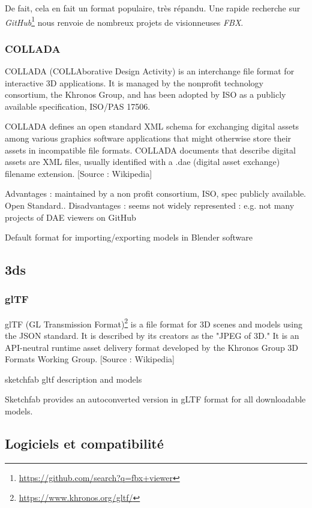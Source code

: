 De fait, cela en fait un format populaire, très répandu.
Une rapide recherche sur \textit{GitHub}\footnote{\url{https://github.com/search?q=fbx+viewer}} nous renvoie de nombreux projets de visionneuses \textit{FBX}.

\subsubsection{COLLADA}
COLLADA (COLLAborative Design Activity) is an interchange file format for interactive 3D applications. It is managed by the nonprofit technology consortium, the Khronos Group, and has been adopted by ISO as a publicly available specification, ISO/PAS 17506.

COLLADA defines an open standard XML schema for exchanging digital assets among various graphics software applications that might otherwise store their assets in incompatible file formats. COLLADA documents that describe digital assets are XML files, usually identified with a .dae (digital asset exchange) filename extension. [Source : Wikipedia]

Advantages : maintained by a non profit consortium, ISO, spec publicly available. Open Standard..
Disadvantages : seems not widely represented : e.g. not many projects of DAE viewers on GitHub

Default format for importing/exporting models in Blender software

\subsection{3ds}


\subsubsection{glTF}
\label{sec:glTF}


glTF (GL Transmission Format)\footnote{\url{https://www.khronos.org/gltf/}} is a file format for 3D scenes and models using the JSON standard. It is described by its creators as the "JPEG of 3D." It is an API-neutral runtime asset delivery format developed by the Khronos Group 3D Formats Working Group. [Source : Wikipedia]

sketchfab gltf description and models

Sketchfab provides an autoconverted version in gLTF format for all downloadable models.

\subsection{Logiciels et compatibilité}


